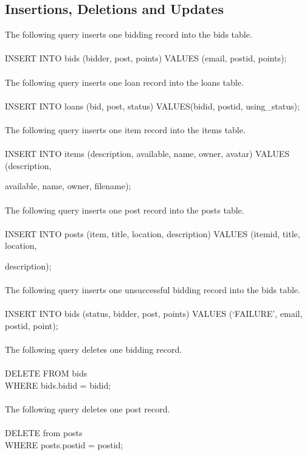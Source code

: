 \subsection{Insertions, Deletions and Updates}
The following query inserts one bidding record into the bids table.\\\\
INSERT INTO bids (bidder, post, points) VALUES (email, postid, points);\\\\
The following query inserts one loan record into the loans table.\\\\
INSERT INTO loans (bid, post, status) VALUES(bidid, postid, using\_status);\\\\
The following query inserts one item record into the items table.\\\\
INSERT INTO items (description, available, name, owner, avatar) VALUES (description, \\ \strut\hspace*{3ex}available, name, owner, filename);\\\\
The following query inserts one post record into the posts table.\\\\
INSERT INTO posts (item, title, location, description) VALUES (itemid, title, location, \\ \strut\hspace*{3ex}description);\\\\
The following query inserts one unsuccessful bidding record into the bids table.\\\\
INSERT INTO bids (status, bidder, post, points) VALUES (`FAILURE', email, postid, point);\\\\
The following query deletes one bidding record.\\\\
DELETE FROM bids\\
WHERE bids.bidid = bidid;\\\\
The following query deletes one post record.\\\\
DELETE from posts\\
WHERE posts.postid = postid;\\\\
